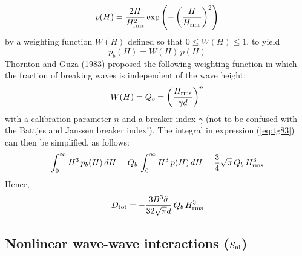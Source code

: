 \documentclass[12pt]{book}
\begin{document}
\begin{equation}
  p(H) = \frac{2H}{H^2_{\rm rms}}\exp \left( - \left( \frac{H}{H_{\rm rms}} \right)^2 \right)
\end{equation}
by a weighting function $W(H)$ defined so that $0 \leq W(H) \leq 1$, to yield
\begin{equation}
  p_b(H) = W(H)\,p(H)
\end{equation}
Thornton and Guza (1983) proposed the following weighting function in which the fraction of breaking waves
is independent of the wave height:
\begin{equation}
  W(H) = Q_b = \left( \frac{H_{\rm rms}}{\gamma d} \right)^n
\end{equation}
with a calibration parameter $n$ and a breaker index $\gamma$ (not to be confused with the Battjes and Janssen breaker index!).
The integral in expression (\ref{eq:tg83}) can then be simplified, as follows:
\begin{equation}
  \int_{0}^{\infty} H^3 \, p_b(H)\,dH = Q_b\,\int_{0}^{\infty} H^3 \, p(H)\,dH = \frac{3}{4}\sqrt{\pi}\,Q_b\,H^3_{\rm rms}
\end{equation}
Hence,
\begin{equation}
  D_{\rm tot} = - \frac{3 B^3 \tilde{\sigma}}{32 \sqrt{\pi} d} \, Q_b\, H^3_{\rm rms}
  \label{eq:tg83_2}
\end{equation}

\subsection{Nonlinear wave-wave interactions ($S_{\rm nl}$)} \label{sec:waveint}
\end{document}
